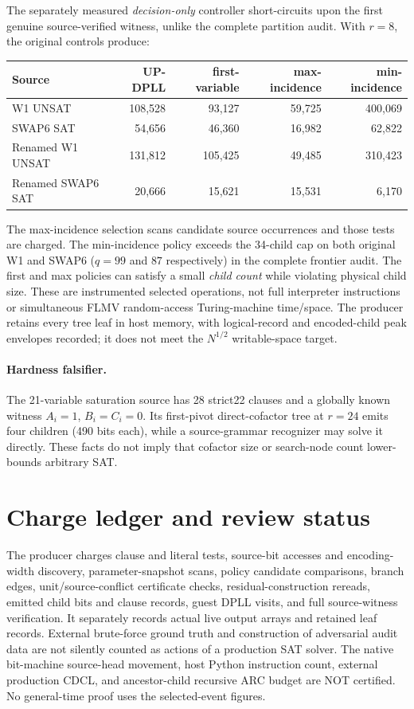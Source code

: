\documentclass[10pt]{article}
\begin{document}
The separately measured \emph{decision-only} controller short-circuits upon the first genuine source-verified witness, unlike the complete partition audit. With $r=8$, the original controls produce:
\begin{center}\small
\begin{tabular}{lrrrr}
\toprule Source&UP-DPLL&first-variable&max-incidence&min-incidence\\\midrule
W1 UNSAT&108,528&93,127&59,725&400,069\\
SWAP6 SAT&54,656&46,360&16,982&62,822\\
Renamed W1 UNSAT&131,812&105,425&49,485&310,423\\
Renamed SWAP6 SAT&20,666&15,621&15,531&6,170\\\bottomrule
\end{tabular}
\end{center}
The max-incidence selection scans candidate source occurrences and those tests are charged. The min-incidence policy exceeds the 34-child cap on both original W1 and SWAP6 ($q=99$ and $87$ respectively) in the complete frontier audit. The first and max policies can satisfy a small \emph{child count} while violating physical child size. These are instrumented selected operations, not full interpreter instructions or simultaneous FLMV random-access Turing-machine time/space. The producer retains every tree leaf in host memory, with logical-record and encoded-child peak envelopes recorded; it does not meet the $N^{1/2}$ writable-space target.

\paragraph{Hardness falsifier.} The 21-variable saturation source has 28 strict22 clauses and a globally known witness $A_i=1$, $B_i=C_i=0$. Its first-pivot direct-cofactor tree at $r=24$ emits four children (490 bits each), while a source-grammar recognizer may solve it directly. These facts do not imply that cofactor size or search-node count lower-bounds arbitrary SAT.

\section{Charge ledger and review status}
The producer charges clause and literal tests, source-bit accesses and encoding-width discovery, parameter-snapshot scans, policy candidate comparisons, branch edges, unit/source-conflict certificate checks, residual-construction rereads, emitted child bits and clause records, guest DPLL visits, and full source-witness verification. It separately records actual live output arrays and retained leaf records. External brute-force ground truth and construction of adversarial audit data are not silently counted as actions of a production SAT solver. The native bit-machine source-head movement, host Python instruction count, external production CDCL, and ancestor-child recursive ARC budget are NOT certified. No general-time proof uses the selected-event figures.
\end{document}
